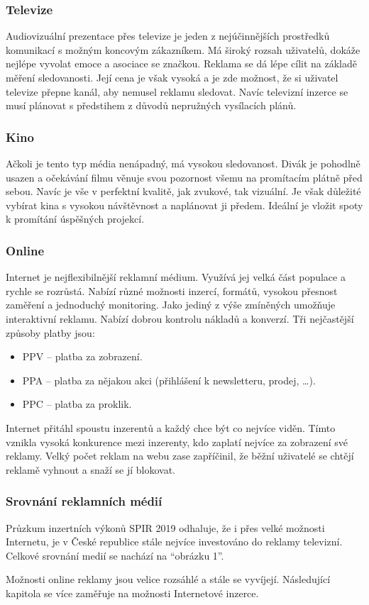     \subsubsection{Televize}
    Audiovizuální prezentace přes televize je jeden z nejúčinnějších prostředků komunikací s možným koncovým zákazníkem.
    Má široký rozsah uživatelů, dokáže nejlépe vyvolat emoce a asociace se značkou. Reklama se dá lépe cílit na základě měření sledovanosti.
    Její cena je však vysoká a je zde možnost, že si uživatel televize přepne kanál, aby nemusel reklamu sledovat.
    Navíc televizní inzerce se musí plánovat s předstihem z důvodů nepružných vysílacích plánů.
    
    \subsubsection{Kino}
    Ačkoli je tento typ média nenápadný, má vysokou sledovanost. Divák je pohodlně usazen a očekávání filmu věnuje svou pozornost všemu na promítacím plátně před sebou.
    Navíc je vše v perfektní kvalitě, jak zvukové, tak vizuální. Je však důležité vybírat kina s vysokou návštěvnost a naplánovat ji předem.
    Ideální je vložit spoty k promítání úspěšných projekcí.

    \subsubsection{Online}
    Internet je nejflexibilnější reklamní médium. Využívá jej velká část populace a rychle se rozrůstá. Nabízí různé možnosti inzercí, formátů,
    vysokou přesnost zaměření a jednoduchý monitoring. Jako jediný z výše zmíněných umožňuje interaktivní reklamu. Nabízí dobrou kontrolu nákladů a konverzí.
    Tři nejčastější způsoby platby jsou:
    \begin{itemize}
        \item PPV -- platba za zobrazení.
        \item PPA -- platba za nějakou akci (přihlášení k newsletteru, prodej, \ldots).
        \item PPC -- platba za proklik.
    \end{itemize}
    Internet přitáhl spoustu inzerentů a každý chce být co nejvíce viděn. Tímto vznikla vysoká konkurence mezi inzerenty, kdo zaplatí nejvíce za zobrazení své reklamy.
    Velký počet reklam na webu zase zapříčinil, že běžní uživatelé se chtějí reklamě vyhnout a snaží se jí blokovat.
    
    \subsubsection{Srovnání reklamních médií}
    Průzkum inzertních výkonů SPIR 2019 odhaluje, že i přes velké možnosti Internetu, je v České republice stále nejvíce investováno do reklamy televizní.
    Celkové srovnání medií se nachází na “obrázku 1”.

    Možnosti online reklamy jsou velice rozsáhlé a stále se vyvíjejí. Následující kapitola se více zaměřuje na možnosti Internetové inzerce.
